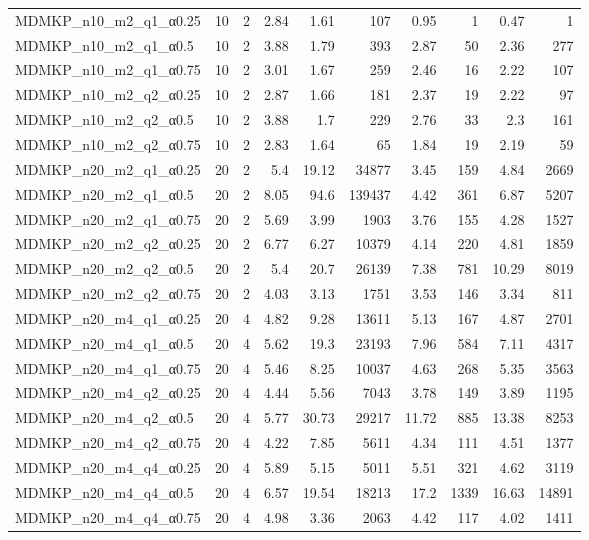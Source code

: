 \begin{center}
\begin{scriptsize}
\begin{longtable}{lrrrrrrrrr}
MDMKP\_n10\_m2\_q1\_α0.25 & 10 & 2 & 2.84 & 1.61 & 107 & 0.95 & 1 & 0.47 & 1\\
MDMKP\_n10\_m2\_q1\_α0.5 & 10 & 2 & 3.88 & 1.79 & 393 & 2.87 & 50 & 2.36 & 277\\
MDMKP\_n10\_m2\_q1\_α0.75 & 10 & 2 & 3.01 & 1.67 & 259 & 2.46 & 16 & 2.22 & 107\\
MDMKP\_n10\_m2\_q2\_α0.25 & 10 & 2 & 2.87 & 1.66 & 181 & 2.37 & 19 & 2.22 & 97\\
MDMKP\_n10\_m2\_q2\_α0.5 & 10 & 2 & 3.88 & 1.7 & 229 & 2.76 & 33 & 2.3 & 161\\
MDMKP\_n10\_m2\_q2\_α0.75 & 10 & 2 & 2.83 & 1.64 & 65 & 1.84 & 19 & 2.19 & 59\\
MDMKP\_n20\_m2\_q1\_α0.25 & 20 & 2 & 5.4 & 19.12 & 34877 & 3.45 & 159 & 4.84 & 2669\\
MDMKP\_n20\_m2\_q1\_α0.5 & 20 & 2 & 8.05 & 94.6 & 139437 & 4.42 & 361 & 6.87 & 5207\\
MDMKP\_n20\_m2\_q1\_α0.75 & 20 & 2 & 5.69 & 3.99 & 1903 & 3.76 & 155 & 4.28 & 1527\\
MDMKP\_n20\_m2\_q2\_α0.25 & 20 & 2 & 6.77 & 6.27 & 10379 & 4.14 & 220 & 4.81 & 1859\\
MDMKP\_n20\_m2\_q2\_α0.5 & 20 & 2 & 5.4 & 20.7 & 26139 & 7.38 & 781 & 10.29 & 8019\\
MDMKP\_n20\_m2\_q2\_α0.75 & 20 & 2 & 4.03 & 3.13 & 1751 & 3.53 & 146 & 3.34 & 811\\
MDMKP\_n20\_m4\_q1\_α0.25 & 20 & 4 & 4.82 & 9.28 & 13611 & 5.13 & 167 & 4.87 & 2701\\
MDMKP\_n20\_m4\_q1\_α0.5 & 20 & 4 & 5.62 & 19.3 & 23193 & 7.96 & 584 & 7.11 & 4317\\
MDMKP\_n20\_m4\_q1\_α0.75 & 20 & 4 & 5.46 & 8.25 & 10037 & 4.63 & 268 & 5.35 & 3563\\
MDMKP\_n20\_m4\_q2\_α0.25 & 20 & 4 & 4.44 & 5.56 & 7043 & 3.78 & 149 & 3.89 & 1195\\
MDMKP\_n20\_m4\_q2\_α0.5 & 20 & 4 & 5.77 & 30.73 & 29217 & 11.72 & 885 & 13.38 & 8253\\
MDMKP\_n20\_m4\_q2\_α0.75 & 20 & 4 & 4.22 & 7.85 & 5611 & 4.34 & 111 & 4.51 & 1377\\
MDMKP\_n20\_m4\_q4\_α0.25 & 20 & 4 & 5.89 & 5.15 & 5011 & 5.51 & 321 & 4.62 & 3119\\
MDMKP\_n20\_m4\_q4\_α0.5 & 20 & 4 & 6.57 & 19.54 & 18213 & 17.2 & 1339 & 16.63 & 14891\\
MDMKP\_n20\_m4\_q4\_α0.75 & 20 & 4 & 4.98 & 3.36 & 2063 & 4.42 & 117 & 4.02 & 1411\\

\end{longtable}
\end{scriptsize}
\end{center}

